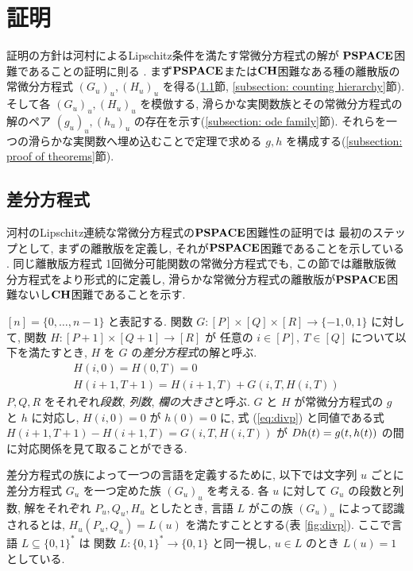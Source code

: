 \section{証明}
\label{section:differentiable}

証明の方針は河村によるLipschitz条件を満たす常微分方程式の解が
$\mathbf{PSPACE}$困難であることの証明に則る
\cite{kawamura2010lipschitz}.
まず$\mathbf{PSPACE}$または$\mathbf{CH}$困難なある種の離散版の常微分方程式
$(G_u)_u, (H_u)_u$ を得る(\ref{section:divp}節, \ref{subsection: counting hierarchy}節).
そして各 $(G_u)_u, (H_u)_u$ を模倣する, 滑らかな実関数族とその常微分方程式の解のペア $(g_u)_u, (h_u)_u$ の存在を示す(\ref{subsection: ode family}節).
それらを一つの滑らかな実関数へ埋め込むことで定理で求める $g, h$ を構成する(\ref{subsection: proof of theorems}節).



\subsection{差分方程式}
\label{section:divp}

河村のLipschitz連続な常微分方程式の$\mathbf{PSPACE}$困難性の証明では
最初のステップとして, まずの離散版を定義し, 
それが$\mathbf{PSPACE}$困難であることを示している
\cite[補題4.7]{kawamura2010lipschitz}.
同じ離散版方程式 1回微分可能関数の常微分方程式でも, 
この節では離散版微分方程式をより形式的に定義し,
滑らかな常微分方程式の離散版が$\mathbf{PSPACE}$困難ないし$\mathbf{CH}$困難であることを示す.

$[n] = \{0, \dots , n-1\}$ と表記する.
関数 $G \colon [P] \times [Q] \times [R] \to \{-1, 0, 1\}$ に対して,
関数 $H \colon [P + 1] \times [Q+1] \to [R]$ が
任意の $i \in [P],\ T \in [Q]$ について以下を満たすとき,
$H$ を $G$ の\emph{差分方程式}の解と呼ぶ.
\begin{gather}
   H(i, 0) = H(0, T) = 0 
\\
   H(i + 1, T + 1) = H(i+1, T) + G(i, T, H(i, T))  \label{eq:divp}
\end{gather}
$P, Q, R$ をそれぞれ\emph{段数}, \emph{列数}, \emph{欄の大きさ}と呼ぶ.
$G$ と $H$ が常微分方程式の $g$ と $h$ に対応し,
$H(i, 0) = 0$ が $h(0) = 0$ に,
式 (\ref{eq:divp}) と同値である式 $H(i + 1, T + 1) - H(i+1, T) = G(i, T, H(i, T))$
が $D h(t) = g(t, h(t))$ の間に対応関係を見て取ることができる.

差分方程式の族によって一つの言語を定義するために,
以下では文字列 $u$ ごとに差分方程式 $G _u$ を一つ定めた族 $(G _u) _u$ を考える. 
各 $u$ に対して $G_u$ の段数と列数, 解をそれぞれ $P_u, Q_u, H_u$ としたとき,
言語 $L$ がこの族 $(G_u)_u$ によって認識されるとは,
$H_u(P_u, Q_u) = L(u)$ を満たすこととする(表 \ref{fig:divp}).
ここで言語 $L \subseteq \{0, 1\} ^*$ は
関数 $L \colon \{0, 1\} ^* \to \{0, 1\}$ と同一視し, 
$u \in L$ のとき $L (u) = 1$ としている. 

